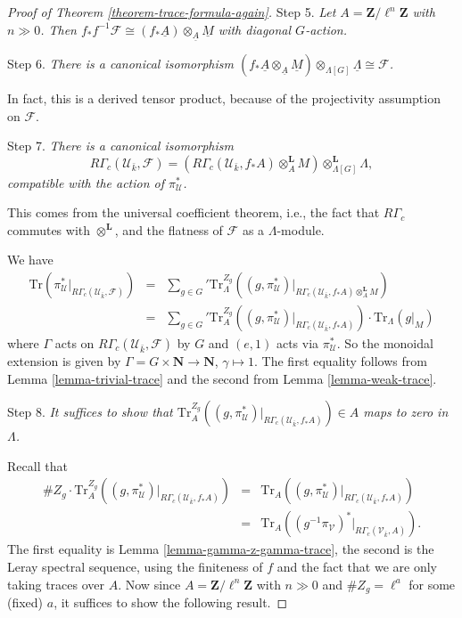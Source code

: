 \begin{proof}[Proof of Theorem \ref{theorem-trace-formula-again}]
\medskip\noindent
Step 5. {\it
Let $A = \mathbf{Z}/\ell^n \mathbf{Z}$ with $n\gg 0$. Then
$f_*f^{-1}\mathcal{F} \cong (f_*\underline A)
\otimes_{\underline A} \underline M$ with diagonal $G$-action.}

\medskip\noindent
Step 6. {\it There is a canonical isomorphism
$(f_*\underline A \otimes_{\underline A} \underline M)
\otimes_{\Lambda[G]} \underline \Lambda \cong \mathcal{F}$.
}

\medskip\noindent
In fact, this is a derived tensor product, because of the projectivity
assumption on $\mathcal{F}$.

\medskip\noindent
Step 7. {\it There is a canonical isomorphism
$$
R\Gamma_c(\mathcal{U}_{\bar k}, \mathcal{F})
= (R\Gamma_c(\mathcal{U}_{\bar k}, f_*A)\otimes_A^\mathbf{L}
M)\otimes_{\Lambda[G]}^\mathbf{L} \Lambda,
$$
compatible with the action of $\pi^*_\mathcal{U}$.
}

\medskip\noindent
This comes from the universal coefficient theorem, i.e., the fact that
$R\Gamma_c$ commutes with $\otimes^\mathbf{L}$, and the flatness of
$\mathcal{F}$ as a $\Lambda$-module.

\medskip\noindent
We have
\begin{eqnarray*}
\text{Tr}(
\pi_\mathcal{U}^*\big|_{R\Gamma_c(\mathcal{U}_{\bar k}, \mathcal{F})})
& = &
{\sum_{g \in G}}'
\text{Tr}_{\Lambda}^{Z_g}
\left(
(g, \pi_\mathcal{U}^*)
\big|_{R\Gamma_c(\mathcal{U}_{\bar k}, f_*A)\otimes_A^\mathbf{L} M}
\right) \\
& = &
{\sum_{g\in G}}'
\text{Tr}_A^{Z_g}
(
(g, \pi_\mathcal{U}^*)\big|_{R\Gamma_c(\mathcal{U}_{\bar k}, f_*A)}
)
\cdot
\text{Tr}_\Lambda(g|_M)
\end{eqnarray*}
where $\Gamma$ acts on $R\Gamma_c(\mathcal{U}_{\bar k}, \mathcal{F})$ by $G$
and $(e, 1)$ acts via $\pi_\mathcal{U}^*$. So the monoidal extension is given
by $\Gamma = G \times \mathbf{N} \to \mathbf{N}$, $\gamma \mapsto 1$. The first
equality follows from Lemma \ref{lemma-trivial-trace} and the second from
Lemma \ref{lemma-weak-trace}.

\medskip\noindent
Step 8. {\it It suffices to show that $\text{Tr}_A^{Z_g}\left((g,
\pi_\mathcal{U}^*)\big|_{R\Gamma_c(\mathcal{U}_{\bar k}, f_*A)}\right) \in A$
maps to zero in $\Lambda$.
}

\medskip\noindent
Recall that
\begin{eqnarray*}
\# Z_g \cdot \text{Tr}_A^{Z_g}\left((g,
\pi_\mathcal{U}^*)\big|_{R\Gamma_c(\mathcal{U}_{\bar k}, f_*A)}\right)
& = & \text{Tr}_A\left((g, \pi_\mathcal{U}^*)\big|_{R\Gamma_c(\mathcal{U}_{\bar
k}, f_*A)}\right)\\
& = &
\text{Tr}_A\left((g^{-1}\pi_\mathcal{V})^*\big|_{R\Gamma_c(\mathcal{V}_{\bar
k}, A)}\right).
\end{eqnarray*}
The first equality is
Lemma \ref{lemma-gamma-z-gamma-trace},
the second is the Leray
spectral sequence, using the finiteness of $f$ and the fact that we are only
taking traces over $A$. Now since $A=\mathbf{Z}/\ell^n\mathbf{Z}$ with
$n \gg 0$ and $\# Z_g = \ell^a$ for some (fixed) $a$,
it suffices to show the following result.


\end{proof}
